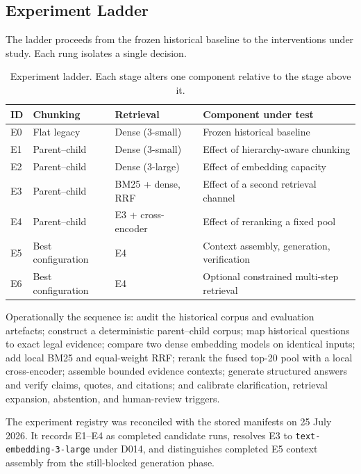 \subsection{Experiment Ladder}

The ladder proceeds from the frozen historical baseline to the interventions under study. Each rung isolates a single decision.

\begin{table}[htbp]
  \centering
  \caption{Experiment ladder. Each stage alters one component relative to the stage above it.}
  \label{tab:ladder}
  \small
  \begin{tabularx}{\textwidth}{@{}l l l X@{}}
    \toprule
    \textbf{ID} & \textbf{Chunking} & \textbf{Retrieval} & \textbf{Component under test} \\
    \midrule
    E0 & Flat legacy & Dense (3-small) & Frozen historical baseline \\
    E1 & Parent--child & Dense (3-small) & Effect of hierarchy-aware chunking \\
    E2 & Parent--child & Dense (3-large) & Effect of embedding capacity \\
    E3 & Parent--child & BM25 + dense, \ac{RRF} & Effect of a second retrieval channel \\
    E4 & Parent--child & E3 + cross-encoder & Effect of reranking a fixed pool \\
    E5 & Best configuration & E4 & Context assembly, generation, verification \\
    E6 & Best configuration & E4 & Optional constrained multi-step retrieval \\
    \bottomrule
  \end{tabularx}
\end{table}

Operationally the sequence is: audit the historical corpus and evaluation artefacts; construct a deterministic parent--child corpus; map historical questions to exact legal evidence; compare two dense embedding models on identical inputs; add local BM25 and equal-weight \ac{RRF}; rerank the fused top-20 pool with a local cross-encoder; assemble bounded evidence contexts; generate structured answers and verify claims, quotes, and citations; and calibrate clarification, retrieval expansion, abstention, and human-review triggers.

The experiment registry was reconciled with the stored manifests on 25 July 2026. It records E1--E4 as completed candidate runs, resolves E3 to \texttt{text-embedding-3-large} under D014, and distinguishes completed E5 context assembly from the still-blocked generation phase.


